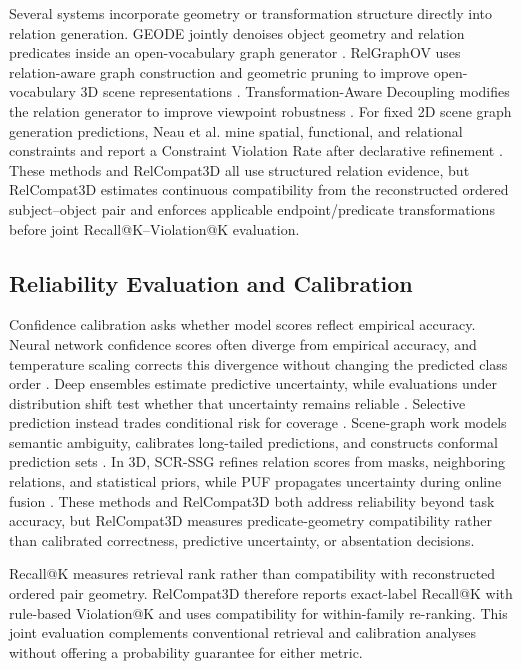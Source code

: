 \documentclass[letterpaper]{article}
\begin{document}
Several systems incorporate geometry or transformation structure directly into relation generation. GEODE jointly denoises object geometry and relation predicates inside an open-vocabulary graph generator \cite{feng2026geode}. RelGraphOV uses relation-aware graph construction and geometric pruning to improve open-vocabulary 3D scene representations \cite{chen2026beyond}. Transformation-Aware Decoupling modifies the relation generator to improve viewpoint robustness \cite{sun2026not}. For fixed 2D scene graph generation predictions, Neau et al. mine spatial, functional, and relational constraints and report a Constraint Violation Rate after declarative refinement \cite{neau2026visual}. These methods and RelCompat3D all use structured relation evidence, but RelCompat3D estimates continuous compatibility from the reconstructed ordered subject--object pair and enforces applicable endpoint/predicate transformations before joint Recall@K--Violation@K evaluation.

\subsection{Reliability Evaluation and Calibration}
Confidence calibration asks whether model scores reflect empirical accuracy. Neural network confidence scores often diverge from empirical accuracy, and temperature scaling corrects this divergence without changing the predicted class order \cite{guo2017calibration}. Deep ensembles estimate predictive uncertainty, while evaluations under distribution shift test whether that uncertainty remains reliable \cite{lakshminarayanan2017simple,ovadia2019can}. Selective prediction instead trades conditional risk for coverage \cite{geifman2017selective}. Scene-graph work models semantic ambiguity, calibrates long-tailed predictions, and constructs conformal prediction sets \cite{yang2021probabilistic,zhu2024calibration,nag2025conformal}. In 3D, SCR-SSG refines relation scores from masks, neighboring relations, and statistical priors, while PUF propagates uncertainty during online fusion \cite{yeo2025statistical,yang2026puf}. These methods and RelCompat3D both address reliability beyond task accuracy, but RelCompat3D measures predicate-geometry compatibility rather than calibrated correctness, predictive uncertainty, or absentation decisions.

Recall@K measures retrieval rank rather than compatibility with reconstructed ordered pair geometry. RelCompat3D therefore reports exact-label Recall@K with rule-based Violation@K and uses compatibility for within-family re-ranking. This joint evaluation complements conventional retrieval and calibration analyses without offering a probability guarantee for either metric.
\end{document}
